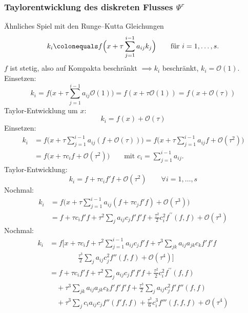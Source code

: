 \subsubsection{Taylorentwicklung des diskreten Flusses \texorpdfstring{$\Psi^\tau$}{Psi^tau}}

Ähnliches Spiel mit den Runge--Kutta Gleichungen
\begin{equation*}
	k_i \colonequals f \Big(x+\tau \sum_{j=1}^{i-1} a_{ij}k_j \Big)
	\qquad
	\text{für $i=1,\ldots,s$}.
\end{equation*}
$f$ ist stetig, also auf Kompakta beschränkt $\implies k_i$ beschränkt, $k_i=\mathcal{O}(1)$. Einsetzen: 
\begin{equation*}
	k_i
	=
	f \bigg(x+\tau \sum_{j=1}^{i-1} a_{ij} \mathcal{O}(1) \bigg)
	=
	f (x+\tau \mathcal{O}(1))
	=
	f(x+\mathcal{O} (\tau))
\end{equation*}
Taylor-Entwicklung um $x$:
\begin{equation*}
	k_i = f(x)+\mathcal{O}(\tau)
\end{equation*}
Einsetzen:
\begin{align*}
	k_i
	& =
	f \bigg(x+\tau \sum_{j=1}^{i-1} a_{ij} (f+\mathcal{O}(\tau)) \bigg)
	=
	f \big(x+\tau \sum_{j=1}^{i-1} a_{ij}f+\mathcal{O}(\tau^2) \big) \\
	&
	=f \big(x+\tau c_if+\mathcal{O} (\tau^2) \big)
	\qquad
	\text{mit $c_i = \sum_{j=1}^{i-1} a_{ij}$}.
\end{align*}
Taylor-Entwicklung:
\begin{equation*}
	k_i = f+\tau c_if'f + \mathcal{O}(\tau^2) \qquad \forall i=1,\ldots,s
\end{equation*}
Nochmal:
\begin{align*}
	k_i
	& =
	f \bigg(x+\tau \sum_{j=1}^{i-1} a_{ij} (f+\tau c_j f'f )+\mathcal{O} (\tau^3) \bigg) \\
	& =
	f+\tau c_i f'f+\tau^2 \sum_j a_{ij} c_j f'f'f+\frac{\tau^2}{2} c_i^2 f^{\prime \prime}(f,f)
	+\mathcal{O}(\tau^3)
\end{align*}
Nochmal:
\begin{align*}
	k_i
	& =
	f \bigg[ x + \tau c_i f + \tau^2 \sum_{j=1}^{i-1} a_{ij} c_j f' f
	+ \tau^3 \sum_{jk} a_{ij} a_{jk} c_k f'f'f \\
	& \qquad \qquad
	\frac{\tau^3}{2} \sum_j a_{ij} c_j^2 f''(f,f) + \mathcal{O}(\tau^4) \bigg]
	\\
	& =
	f+\tau c_i f'f+\tau^2 \sum_j a_{ij}c_j f'f'f+\frac{\tau^2}{2}c_i^2 f^{\prime \prime}(f,f) \\
	& \quad
	+\tau^3 \sum_{jk} a_{ij} a_{jk} c_k f'f'f'f + \frac{\tau^3}{2} \sum_j a_{ij} c_j^2 f' f''(f,f) \\
	& \quad
	+ \tau^3 \sum_{j} c_i a_{ij} c_j f''(f'f,f) + \frac{\tau^3}{6} c_i^3 f'''(f,f,f)
	+\mathcal{O}(\tau^4)
\end{align*}
